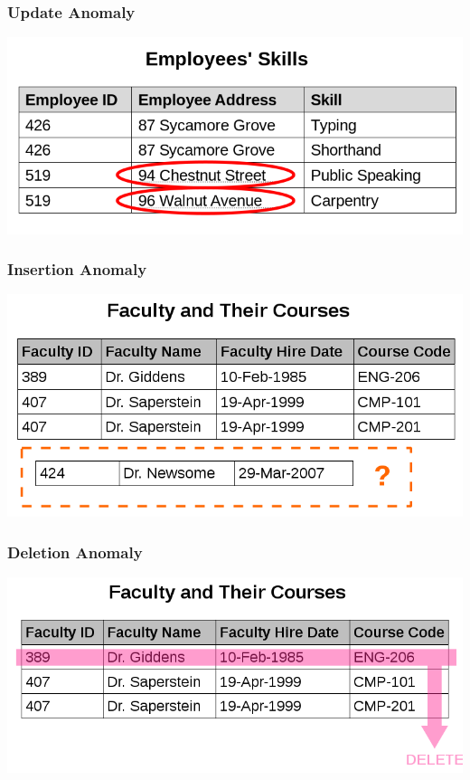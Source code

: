 \documentclass[xcolor=dvipsnames]{beamer}
\begin{document}
\begin{frame}
  \frametitle{Update Anomaly}

  \begin{center}
    \includegraphics[width=0.8\paperwidth]{Update_anomaly.png}
  \end{center}
\end{frame}

\begin{frame}
  \frametitle{Insertion Anomaly}

  \begin{center}
    \includegraphics[width=0.8\paperwidth]{Insertion_anomaly.png}
  \end{center}
\end{frame}

\begin{frame}
  \frametitle{Deletion Anomaly}

  \begin{center}
    \includegraphics[width=0.8\paperwidth]{Deletion_anomaly.png}
  \end{center}
\end{frame}
\end{document}
